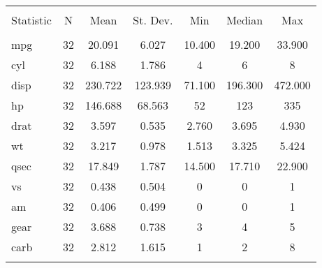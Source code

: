 
\begin{table}[!htbp] \centering 
  \caption{} 
  \label{} 
\begin{tabular}{@{\extracolsep{5pt}}lcccccc} 
\\[-1.8ex]\hline 
\hline \\[-1.8ex] 
Statistic & \multicolumn{1}{c}{N} & \multicolumn{1}{c}{Mean} & \multicolumn{1}{c}{St. Dev.} & \multicolumn{1}{c}{Min} & \multicolumn{1}{c}{Median} & \multicolumn{1}{c}{Max} \\ 
\hline \\[-1.8ex] 
mpg & 32 & 20.091 & 6.027 & 10.400 & 19.200 & 33.900 \\ 
cyl & 32 & 6.188 & 1.786 & 4 & 6 & 8 \\ 
disp & 32 & 230.722 & 123.939 & 71.100 & 196.300 & 472.000 \\ 
hp & 32 & 146.688 & 68.563 & 52 & 123 & 335 \\ 
drat & 32 & 3.597 & 0.535 & 2.760 & 3.695 & 4.930 \\ 
wt & 32 & 3.217 & 0.978 & 1.513 & 3.325 & 5.424 \\ 
qsec & 32 & 17.849 & 1.787 & 14.500 & 17.710 & 22.900 \\ 
vs & 32 & 0.438 & 0.504 & 0 & 0 & 1 \\ 
am & 32 & 0.406 & 0.499 & 0 & 0 & 1 \\ 
gear & 32 & 3.688 & 0.738 & 3 & 4 & 5 \\ 
carb & 32 & 2.812 & 1.615 & 1 & 2 & 8 \\ 
\hline \\[-1.8ex] 
\end{tabular} 
\end{table} 
